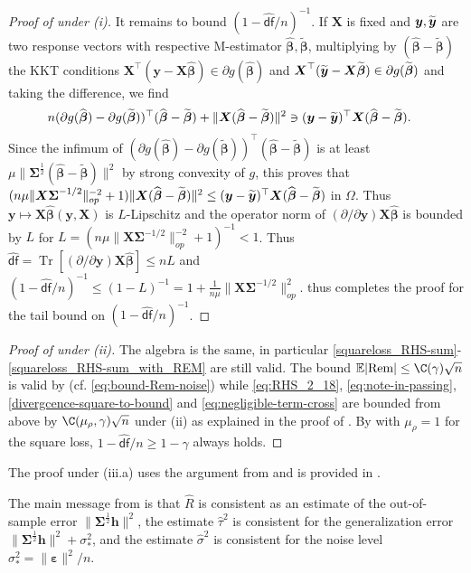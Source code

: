 \documentclass[11pt]{amsart}
\numberwithin{equation}{section}
\numberwithin{equation}{section}
\def\E{{\mathbb{E}}}
\def\Rem{\hbox{\rm Rem}}
\DeclareMathOperator{\trace}{Tr}
\def\mathbold{\boldsymbol} %
\def\bh{\mathbold{h}}\def\hhat{\widehat{h}}\def\htil{\widetilde{h}}
\def\bX{\mathbold{X}}\def\hbX{{\widehat{\bX}}}\def\tbX{{\widetilde{\bX}}}\def\bXbar{{\overline \bX}}
\def\by{\mathbold{y}}\def\yhat{\widehat{y}}\def\ytil{\widetilde{y}}\def\ybar{{\overline y}}\def\vby{{\bf y}}
\def\bbeta{\mathbold{\beta}}\def\betahat{\widehat{\beta}}\def\hbeta{\widehat{\beta}}
\def\hbbeta{{{\widehat{\bbeta}}}}
\def\tbbeta{\widetilde{\bbeta}}
\def\ep{\varepsilon}\def\eps{\epsilon}\def\veps{\varepsilon}
\def\bep{ {\mathbold{\ep} }}
\def\bSigma{\mathbold{\Sigma}}\def\hbSigma{{\widehat{\bSigma}}}
\def\df{{\hat{\mathsf{df}}}{}}
\newcommand\pb[1]{{ #1 }}
\begin{document}
{\begin{proof}[Proof of  under (i)]
    It remains to bound $(1-\df/n)^{-1}$.
    If $\bX$ is fixed and $\by,\tby$ are two response vectors
    with respective M-estimator $\hbbeta,\tbbeta$,
    multiplying by $(\hbbeta-\tbbeta)$ the KKT conditions
    $\bX^\top(\by-\bX\hbbeta) \in \partial g(\hbbeta)$
    and
    $\bX^\top(\tby-\bX\tbbeta) \in \partial g(\tbbeta)$
    and taking the difference, we find
    \begin{align}
        n (\partial g(\hbbeta) - \partial g(\tbbeta))^\top(\hbbeta-\tbbeta)
        + \|\bX(\hbbeta-\tbbeta)\|^2
        &\ni
        (\by-\tby)^\top\bX(\hbbeta-\tbbeta).
    \end{align}
    Since the infimum of
    $(\partial g(\hbbeta) - \partial g(\tbbeta))^\top(\hbbeta-\tbbeta)$
    is at least $\mu \|\bSigma^{\frac12}(\hbbeta-\tbbeta)\|^2$
    by strong convexity of $g$,
    this proves that
    $(n\mu\|\bX\bSigma^{-1/2}\|_{op}^{ \pb{ -2} } + 1) \|\bX(\hbbeta-\tbbeta)\|^2
    \le
    (\by-\tby)^\top\bX(\hbbeta-\tbbeta)$
    in $\Omega$.
    Thus $\by\mapsto \bX\hbbeta(\by,\bX)$
    is $L$-Lipschitz and the operator norm of $(\partial/\partial \pb{\by})\bX\hbbeta$ is bounded by $L$ for 
    $L=(n\mu\|\bX\bSigma^{-1/2}\|_{op}^{ \pb{ -2} } + 1)^{-1} < 1$.
    Thus $\df=\trace[(\partial/\partial \pb{ \by })\bX\hbbeta]\le nL$ and
    $(1-\df/n)^{-1} \le (1-L)^{-1}
    = 1 + \frac{1}{n\mu}\|\bX\bSigma^{-1/2}\|_{op}^2
    $.  thus completes the proof for the tail bound
    on $(1-\df/n)^{-1}$.
\end{proof}

\begin{proof}[Proof of  under (ii)]
    The algebra is the same, in particular
    \eqref{squareloss_RHS-sum}-\eqref{squareloss_RHS-sum_with_REM} are still
    valid. The bound $\E|\Rem|\le \C(\gamma)\sqrt n$ is valid by  (cf. \eqref{eq:bound-Rem-noise})
    while 
        \eqref{eq:RHS_2_18},
        \eqref{eq:note-in-passing},
        \eqref{divergcence-square-to-bound} and
        \eqref{eq:negligible-term-cross}
    are bounded from above by $\C(\mu_\rho,\gamma)\sqrt n$
    under (ii) as explained in the proof of 
    .
    By  with $\mu_\rho=1$ for the square loss,
    $1-\df/n \ge 1-\gamma$ always holds.
\end{proof}

The proof under (iii.a) uses the argument
from 
and is provided in .}
The main message from  
is that $\hat R$ is consistent as an estimate of the out-of-sample
error $\|\bSigma^{\frac12}\bh\|^2$,
the estimate $\hat \tau^2$ is consistent for the generalization error
$\|\bSigma^{\frac12}\bh\|^2 + \sigma_*^2$,
and the estimate $\hat\sigma^2$
is consistent for the noise level $\sigma_*^2 =\|\bep\|^2/n$.
\end{document}
